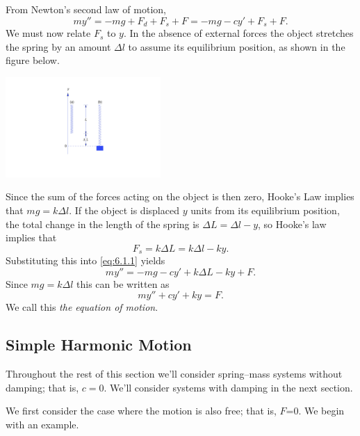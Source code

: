 \documentclass{ximera}
\begin{document}
 
 
From Newton's second law of motion,
\begin{equation}\label{eq:6.1.1}
my''=-mg+F_d+F_s+F=-mg-cy'+F_s+F.
\end{equation}
We must now relate $F_s$ to $y$. In the absence of external forces the
object stretches the spring by an amount $\Delta l$ to assume its
equilibrium position, as shown in the figure below.
 
\begin{image}
  \includegraphics[height=1.5in]{fig060103.jpg}
\end{image}
 
Since the sum of the forces acting on the object
is then zero, Hooke's Law implies that $mg=k\Delta l$. If the object
is displaced $y$ units from its equilibrium position, the total
change in the length of the spring is $\Delta L=\Delta l-y$,
 so Hooke's law implies that
 $$
F_s=k\Delta L=k\Delta l-ky.
$$
Substituting this into \eqref{eq:6.1.1} yields
$$
my''=-mg-cy'+k\Delta L-ky+F.
$$
Since $mg=k\Delta l$ this can be written as
\begin{equation}\label{eq:6.1.2}
my''+cy'+ky=F.
\end{equation}
We call this \textit{the equation of motion}.
 
 
\subsection*{Simple Harmonic Motion}
 
Throughout the rest of this section we'll consider spring--mass
systems without damping; that is, $c=0$. We'll consider systems with
damping in the next section.
 
We first consider the case where the motion is also free; that is,
$F$=0. We begin with an example.
 
\end{document}
